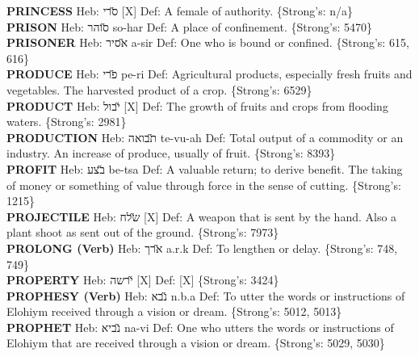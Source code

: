 {\textbf{PRINCESS} Heb: {\large\H סרי} {[}X{]} Def: A female of authority. \{Strong's: n/a\}\hfill{}\\

\textbf{PRISON} Heb: {\large\H סוהר} so-har Def: A place of confinement. \{Strong's: 5470\}\hfill{}\\

\textbf{PRISONER} Heb: {\large\H אסיר} a-sir Def: One who is bound or confined. \{Strong's: 615, 616\}\hfill{}\\

\textbf{PRODUCE} Heb: {\large\H פרי} pe-ri Def: Agricultural products, especially fresh fruits and vegetables. The harvested product of a crop. \{Strong's: 6529\}\hfill{}\\

\textbf{PRODUCT} Heb: {\large\H יבול} {[}X{]} Def: The growth of fruits and crops from flooding waters. \{Strong's: 2981\}\hfill{}\\

\textbf{PRODUCTION} Heb: {\large\H תבואה} te-vu-ah Def: Total output of a commodity or an industry. An increase of produce, usually of fruit. \{Strong's: 8393\}\hfill{}\\

\textbf{PROFIT} Heb: {\large\H בצע} be-tsa Def: A valuable return; to derive benefit. The taking of money or something of value through force in the sense of cutting. \{Strong's: 1215\}\hfill{}\\

\textbf{PROJECTILE} Heb: {\large\H שלח} {[}X{]} Def: A weapon that is sent by the hand. Also a plant shoot as sent out of the ground. \{Strong's: 7973\}\hfill{}\\

\textbf{PROLONG (Verb)} Heb: {\large\H ארך} a.r.k Def: To lengthen or delay. \{Strong's: 748, 749\}\hfill{}\\

\textbf{PROPERTY} Heb: {\large\H ירשה} {[}X{]} Def: {[}X{]} \{Strong's: 3424\}\hfill{}\\

\textbf{PROPHESY (Verb)} Heb: {\large\H נבא} n.b.a Def: To utter the words or instructions of Elohiym received through a vision or dream. \{Strong's: 5012, 5013\}\hfill{}\\

\textbf{PROPHET} Heb: {\large\H נביא} na-vi Def: One who utters the words or instructions of Elohiym that are received through a vision or dream. \{Strong's: 5029, 5030\}\hfill{}\\

}
